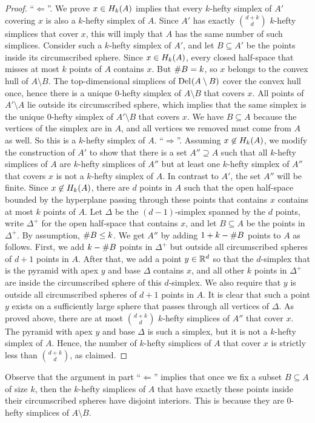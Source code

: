 \documentclass[10pt,a4paper]{article}
\newcommand {\mm}[1] {\ifmmode{#1}\else{\mbox{\(#1\)}}\fi}
\theoremstyle{plain}
\newcommand{\Rspace}        {\mm{{\mathbb R}}}
\newcommand{\Delaunay}[2]   {\mm{{\rm Del}_{#1}{({#2})}}}
\newcommand{\Hull}[2]       {\mm{{H}_{#1}{({#2})}}}
\newcommand{\card}[1]       {\mm{{\#}{#1}}}
\begin{document}
\begin{proof}
  \smallskip
  ``$\Longleftarrow$''.
  We prove $x \in \Hull{k}{A}$ implies that every $k$-hefty simplex of $A'$ covering $x$ is also a $k$-hefty simplex of $A$.
  Since $A'$ has exactly $\binom{d+k}{d}$ $k$-hefty simplices that cover $x$, this will imply that $A$ has the same number of such simplices.
  Consider such a $k$-hefty simplex of $A'$, and let $B \subseteq A'$ be the points inside its circumscribed sphere.
  Since $x \in \Hull{k}{A}$, every closed half-space that misses at most $k$ points of $A$ contains $x$.
  But $\card{B} = k$, so $x$ belongs to the convex hull of $A \setminus B$.
  The top-dimensional simplices of $\Delaunay{}{A \setminus B}$ cover the convex hull once, hence there is a unique $0$-hefty simplex of $A \setminus B$ that covers $x$.
  All points of $A' \setminus A$ lie outside its circumscribed sphere, which implies that the same simplex is the unique $0$-hefty simplex of $A'\setminus B$ that covers $x$.
  We have $B \subseteq A$ because the vertices of the simplex are in $A$, and all vertices we removed must come from $A$ as well.
  So this is a $k$-hefty simplex of $A$.
  \smallskip
  ``$\Longrightarrow$''.
  Assuming $x \not\in \Hull{k}{A}$, we modify the construction of $A'$ to show that there is a set $A'' \supseteq A$ such that all $k$-hefty simplices of $A$ are $k$-hefty simplices of $A''$ but at least one $k$-hefty simplex of $A''$ that covers $x$ is not a $k$-hefty simplex of $A$.
  In contrast to $A'$, the set $A''$ will be finite.
  Since $x \not\in \Hull{k}{A}$, there are $d$ points in $A$ such that the open half-space bounded by the hyperplane passing through these points that contains $x$ contains at most $k$ points of $A$.
  Let $\Delta$ be the $(d-1)$-simplex spanned by the $d$ points, write $\Delta^+$ for the open half-space that contains $x$, and let $B \subseteq A$ be the points in $\Delta^+$.
  By assumption, $\card{B} \leq k$.
  We get $A''$ by adding $1 + k - \card{B}$ points to $A$ as follows.
  First, we add $k-\card{B}$ points in $\Delta^+$ but outside all circumscribed spheres of $d+1$ points in $A$.
  After that, we add a point $y \in \Rspace^d$ so that the $d$-simplex that is the pyramid with apex $y$ and base $\Delta$ contains $x$, and all
  other $k$ points in $\Delta^+$ are inside the circumscribed sphere of this $d$-simplex. 
  We also require that $y$ is outside all circumscribed spheres of $d+1$ points in $A$.
  It is clear that such a point $y$ exists on a sufficiently large sphere that passes through all vertices of $\Delta$.
  As proved above, there are at most $\binom{d+k}{d}$ $k$-hefty simplices of $A''$ that cover $x$.
  The pyramid with apex $y$ and base $\Delta$ is such a simplex, but it is not a $k$-hefty simplex of $A$.
  Hence, the number of $k$-hefty simplices of $A$ that cover $x$ is strictly less than $\binom{d+k}{d}$, as claimed.
\end{proof}
Observe that the argument in part ``$\Longleftarrow$'' implies that once we fix a subset $B \subseteq A$ of size $k$, then the $k$-hefty simplices of $A$ that have exactly these points inside their circumscribed spheres have disjoint interiors.
This is because they are $0$-hefty simplices of $A \setminus B$.
\end{document}
